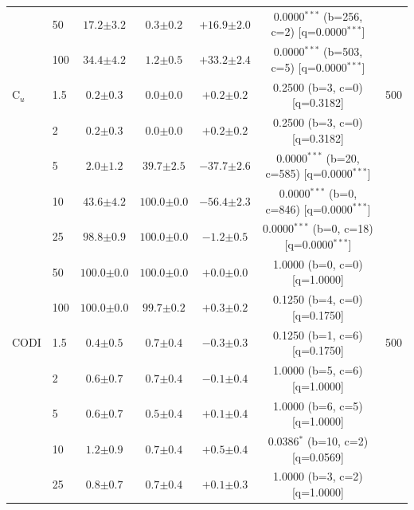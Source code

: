 \begin{table}[h!]
\begin{tabular}{l l cccc c}
 & 50 & $17.2 {\scriptstyle \pm 3.2}$ & $0.3 {\scriptstyle \pm 0.2}$ & $+16.9 {\scriptstyle \pm 2.0}$ & 0.0000$^{***}$ (b=256, c=2) [q=0.0000$^{***}$] &  \\
 & 100 & $34.4 {\scriptstyle \pm 4.2}$ & $1.2 {\scriptstyle \pm 0.5}$ & $+33.2 {\scriptstyle \pm 2.4}$ & 0.0000$^{***}$ (b=503, c=5) [q=0.0000$^{***}$] &  \\
\midrule
C$_u$ & 1.5 & $0.2 {\scriptstyle \pm 0.3}$ & $0.0 {\scriptstyle \pm 0.0}$ & $+0.2 {\scriptstyle \pm 0.2}$ & 0.2500 (b=3, c=0) [q=0.3182] & 500 \\
 & 2 & $0.2 {\scriptstyle \pm 0.3}$ & $0.0 {\scriptstyle \pm 0.0}$ & $+0.2 {\scriptstyle \pm 0.2}$ & 0.2500 (b=3, c=0) [q=0.3182] &  \\
 & 5 & $2.0 {\scriptstyle \pm 1.2}$ & $39.7 {\scriptstyle \pm 2.5}$ & $-37.7 {\scriptstyle \pm 2.6}$ & 0.0000$^{***}$ (b=20, c=585) [q=0.0000$^{***}$] &  \\
 & 10 & $43.6 {\scriptstyle \pm 4.2}$ & $100.0 {\scriptstyle \pm 0.0}$ & $-56.4 {\scriptstyle \pm 2.3}$ & 0.0000$^{***}$ (b=0, c=846) [q=0.0000$^{***}$] &  \\
 & 25 & $98.8 {\scriptstyle \pm 0.9}$ & $100.0 {\scriptstyle \pm 0.0}$ & $-1.2 {\scriptstyle \pm 0.5}$ & 0.0000$^{***}$ (b=0, c=18) [q=0.0000$^{***}$] &  \\
 & 50 & $100.0 {\scriptstyle \pm 0.0}$ & $100.0 {\scriptstyle \pm 0.0}$ & $+0.0 {\scriptstyle \pm 0.0}$ & 1.0000 (b=0, c=0) [q=1.0000] &  \\
 & 100 & $100.0 {\scriptstyle \pm 0.0}$ & $99.7 {\scriptstyle \pm 0.2}$ & $+0.3 {\scriptstyle \pm 0.2}$ & 0.1250 (b=4, c=0) [q=0.1750] &  \\
\midrule
CODI & 1.5 & $0.4 {\scriptstyle \pm 0.5}$ & $0.7 {\scriptstyle \pm 0.4}$ & $-0.3 {\scriptstyle \pm 0.3}$ & 0.1250 (b=1, c=6) [q=0.1750] & 500 \\
 & 2 & $0.6 {\scriptstyle \pm 0.7}$ & $0.7 {\scriptstyle \pm 0.4}$ & $-0.1 {\scriptstyle \pm 0.4}$ & 1.0000 (b=5, c=6) [q=1.0000] &  \\
 & 5 & $0.6 {\scriptstyle \pm 0.7}$ & $0.5 {\scriptstyle \pm 0.4}$ & $+0.1 {\scriptstyle \pm 0.4}$ & 1.0000 (b=6, c=5) [q=1.0000] &  \\
 & 10 & $1.2 {\scriptstyle \pm 0.9}$ & $0.7 {\scriptstyle \pm 0.4}$ & $+0.5 {\scriptstyle \pm 0.4}$ & 0.0386$^{*}$ (b=10, c=2) [q=0.0569] &  \\
 & 25 & $0.8 {\scriptstyle \pm 0.7}$ & $0.7 {\scriptstyle \pm 0.4}$ & $+0.1 {\scriptstyle \pm 0.3}$ & 1.0000 (b=3, c=2) [q=1.0000] &  \\

\end{tabular}
\end{table}
